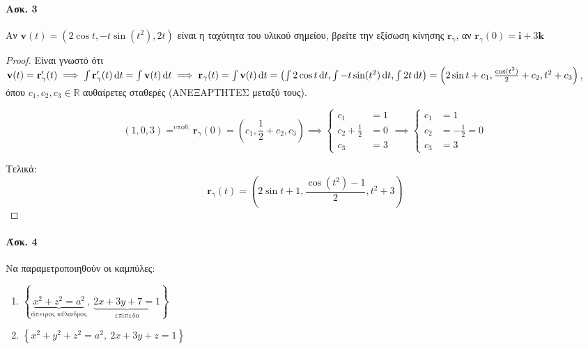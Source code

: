 \documentclass[11pt,a4paper,titlepage,draft]{article}
\begin{document}
\paragraph{Ασκ. 3}
Αν \(\mathbf v(t) = \left( 2 \cos t, -t \sin (t^2), 2t \right) \) είναι η ταχύτητα του υλικού σημείου, βρείτε την εξίσωση κίνησης \(\mathbf r_\gamma \), αν \( \mathbf r_\gamma (0) = \mathbf i + 3 \mathbf k\)
\begin{proof}
Είναι γνωστό ότι \(\mathbf v(t) = \mathbf r'_\gamma(t) \implies \int \mathbf r'_\gamma(t) \dif t = \int \mathbf v(t) \dif t \implies \mathbf r_\gamma(t) = \int \mathbf v(t) \dif t = \left( \int 2 \cos t \dif t, \int - t \sin (t^2) \dif t, \int 2t \dif t \right) = \left( 2 \sin t+ c_1, \frac{\cos (t^2)}{2} + c_2, t^2+c_3 \right)\), όπου \(c_1,c_2,c_3 \in \mathbb R \) αυθαίρετες σταθερές (ΑΝΕΞΑΡΤΗΤΕΣ μεταξύ τους).

\[
(1,0,3) =^\text{υποθ.}  \mathbf r_\gamma(0) =  %
\left( c_1, \frac{1}{2} + c_2, c_3 \right) \implies
\begin{cases}
c_1&=1 \\
c_2+\frac{1}{2}&=0 \\
c_3&=3
\end{cases}
\implies
\begin{cases}
c_1&=1 \\
c_2&=-\frac{1}{2}=0 \\
c_3&=3
\end{cases}
\]

Τελικά:
\[
\mathbf r_\gamma(t) = 
\left(
2 \sin t +1, \frac{\cos (t^2)-1}{2}, t^2+3
\right)
\]

\end{proof}


\paragraph{Άσκ. 4}
Να παραμετροποιηθούν οι καμπύλες:
\begin{enumerate}
\item \( \left\lbrace \underbrace{x^2+z^2=a^2}_{\text{άπειρος κύλινδρος}}, \ \underbrace{2x+3y+7=1}_{\text{επίπεδο}}  \right\rbrace\)
\item \( \left\lbrace x^2+y^2+z^2=a^2, \ 2x+3y+z =1  \right\rbrace \)
\end{enumerate}
\end{document}
